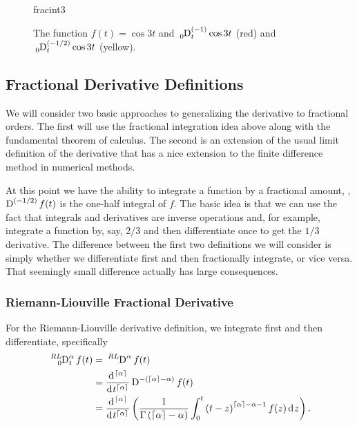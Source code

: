     \begin{figure}
      \centering
      {fracint3}
      \caption{The function $f(t) = \cos 3 t$ and $\tensor*[_0]{\D}{^{(-1)}_t} \cos 3 t$ (red) and $\tensor*[_0]{\D}{^{(-1/2)}_t} \cos 3t$ (yellow).}
      \label{fig:fracint3}
    \end{figure}

    \subsection{Fractional Derivative Definitions}

    We will consider two basic approaches to generalizing the derivative to fractional orders. The first will use the fractional integration idea above along with the fundamental theorem of calculus. The second is an extension of the usual limit definition of the derivative that has a nice extension to the finite difference method in numerical methods.

    At this point we have the ability to integrate a function by a fractional amount, \eg, $\tensor*{\D}{^{\left( -1/2 \right)}}f(t)$ is the one-half integral of $f$. The basic idea is that we can use the fact that integrals and derivatives are inverse operations and, for example, integrate a function by, say, $2/3$ and then differentiate once to get the $1/3$ derivative. The difference between the first two definitions we will consider is simply whether we differentiate first and then fractionally integrate, or vice versa. That seemingly small difference actually has large consequences.

    \subsubsection{Riemann-Liouville Fractional Derivative}

    For the Riemann-Liouville derivative definition, we integrate first and then differentiate, specifically 
    \begin{equation}
      \begin{aligned}
	\tensor*[^{RL}_0]{\D}{^\alpha_t}  f(t) &= \tensor*[^{RL}]{\D}{^\alpha} f(t) \\
	&= \frac{\d^{\lc \alpha \rc}}{\d t^{\lc \alpha \rc}} \tensor*[]{\D}{^{-\left( \lc \alpha \rc - \alpha \right)}} f(t) \\ 
	&= 
	\frac{\d^{\lc \alpha \rc}}{\d t^{\lc \alpha \rc}} \left( \frac{1}{\Gamma\left(\lc \alpha \rc - \alpha \right)}
	\int_0^t \left( t - z \right)^{\lc \alpha \rc - \alpha - 1} f(z) \d z \right). 
      \end{aligned}
      \label{eq:rldef}
    \end{equation}

